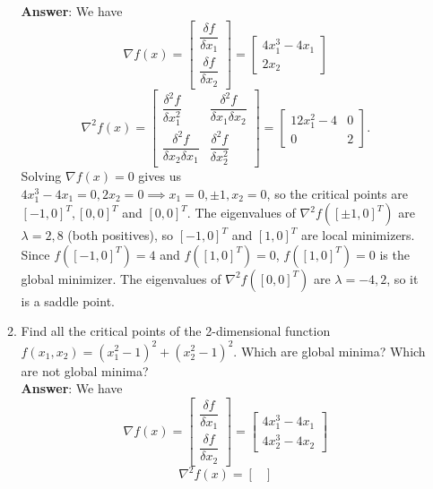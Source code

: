 \documentclass{article}
\begin{document}
\begin{enumerate}
\begin{enumerate}
                    \textbf{Answer}: We have \[
                        \nabla f(x)=\begin{bmatrix}
                            \dfrac{\delta f}{\delta x_1} \\\dfrac{\delta f}{\delta x_2}
                        \end{bmatrix}=\begin{bmatrix}
                            4x_1^3-4x_1 \\2x_2
                        \end{bmatrix}
                    \]\[
                        \nabla^2 f(x)=\begin{bmatrix}
                            \dfrac{\delta^2 f}{\delta x_1^2} & \dfrac{\delta^2 f}{\delta x_1\delta x_2} \\\dfrac{\delta^2 f}{\delta x_2\delta x_1}&\dfrac{\delta^2 f}{\delta x_2^2}
                        \end{bmatrix}=\begin{bmatrix}
                            12x_1^2-4 & 0 \\
                            0         & 2
                        \end{bmatrix}.
                    \] Solving $\nabla f(x)=0$ gives us $4x_1^3-4x_1=0,2x_2=0\implies x_1=0,\pm 1,x_2=0$, so the critical points are $[-1,0]^T, [0,0]^T$ and $[0,0]^T$. The eigenvalues of $\nabla^2 f([\pm 1,0]^T)$ are $\lambda=2,8$ (both positives), so $[-1,0]^T$ and $[1,0]^T$ are local minimizers. Since $f([-1,0]^T)=4$ and $f([1,0]^T)=0$, $f([1,0]^T)=0$ is the global minimizer. The eigenvalues of $\nabla^2 f([0,0]^T)$ are $\lambda=-4,2$, so it is a saddle point.
              \item Find all the critical points of the 2-dimensional function $f(x_1,x_2)=(x_1^2-1)^2+(x_2^2-1)^2$. Which are global minima? Which are not global minima?\\
                    \textbf{Answer}: We have \[
                        \nabla f(x)=\begin{bmatrix}
                            \dfrac{\delta f}{\delta x_1} \\\dfrac{\delta f}{\delta x_2}
                        \end{bmatrix}=\begin{bmatrix}
                            4x_1^3-4x_1 \\4x_2^3-4x_2
                        \end{bmatrix}
                    \]\[
                        \nabla^2 f(x)=\begin{bmatrix}

\end{bmatrix}\]
\end{enumerate}
\end{enumerate}
\end{document}
